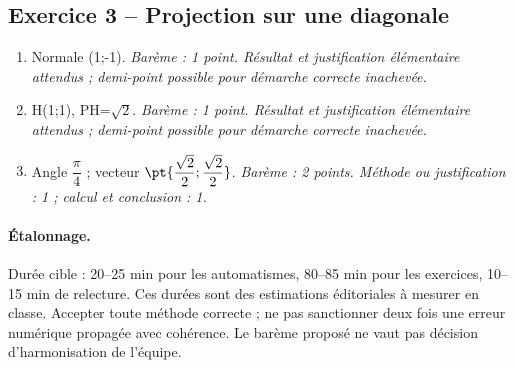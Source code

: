 \subsection*{Exercice 3 -- Projection sur une diagonale}
\begin{enumerate}
\item Normale (1;-1). \textit{Barème : 1 point. Résultat et justification élémentaire attendus ; demi-point possible pour démarche correcte inachevée.}
\item H(1;1), PH=$\sqrt2$. \textit{Barème : 1 point. Résultat et justification élémentaire attendus ; demi-point possible pour démarche correcte inachevée.}
\item Angle $\dfrac{\pi}{4}$ ; vecteur $\pt{\dfrac{\sqrt 2}{2};\dfrac{\sqrt 2}{2}}$. \textit{Barème : 2 points. Méthode ou justification : 1 ; calcul et conclusion : 1.}
\end{enumerate}
\paragraph{Étalonnage.} Durée cible : 20–25 min pour les automatismes, 80–85 min pour les exercices, 10–15 min de relecture. Ces durées sont des estimations éditoriales à mesurer en classe. Accepter toute méthode correcte ; ne pas sanctionner deux fois une erreur numérique propagée avec cohérence. Le barème proposé ne vaut pas décision d’harmonisation de l’équipe.
